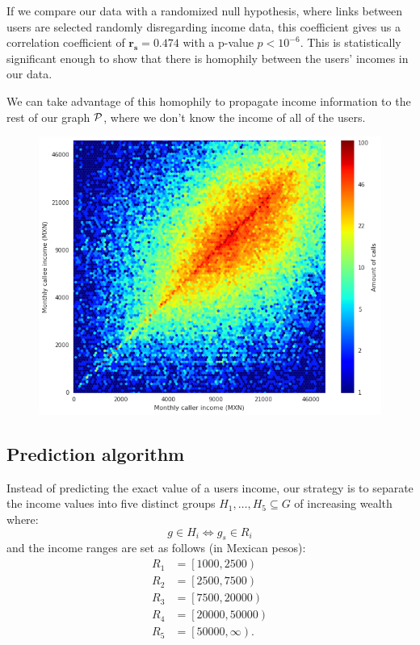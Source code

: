 If we compare our data with a randomized null hypothesis, where links between users are selected randomly disregarding income data, this coefficient gives us a correlation coefficient of $\mathbf{r_s = 0.474} $ with a p-value $ p < 10^{-6} $. This is statistically significant enough to show that there is homophily between the users' incomes in our data.

We can take advantage of this homophily to propagate income information to the rest of our graph $ \mathcal{P} $, where we don't know the income of all of the users.

\begin{figure}[h]
\begin{center}
\includegraphics[width=1\columnwidth]{figures/Homophily_income_origin_target_1/Homophily_income_origin_target_1.png}
\caption{ \protect}
\label{homophily_heatmap}
\end{center}
\end{figure}

\subsection{Prediction algorithm}

Instead of predicting the exact value of a users income, our strategy is to separate the income values into five distinct groups $ H_1, \ldots, H_5 \subseteq G$ of increasing wealth where:
\[
	g \in H_i \iff g_s \in R_i
\]
and the income ranges are set as follows (in Mexican pesos):
\begin{align*}
	R_1 &= \left[1000, 2500\right) \\
	R_2 &= \left[2500, 7500\right) \\
	R_3 &= \left[7500, 20000\right) \\
	R_4 &= \left[20000, 50000\right) \\
	R_5 &= \left[50000, \infty\right). \\
\end{align*}

